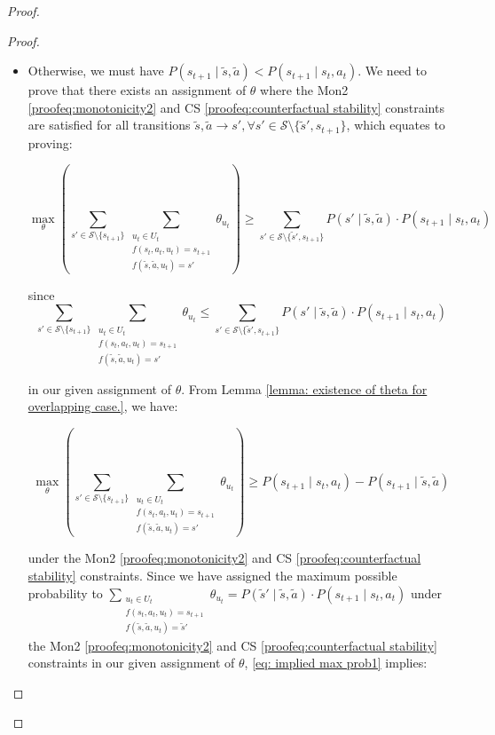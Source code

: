 \begin{proof}
\begin{proof}
\begin{itemize}
\begin{itemize}
        \item Otherwise, we must have $P(s_{t+1} \mid \tilde{s}, \tilde{a}) < P(s_{t+1} \mid s_t, a_t)$. We need to prove that there exists an assignment of $\theta$ where the Mon2 \eqref{proofeq:monotonicity2} and CS \eqref{proofeq:counterfactual stability} constraints are satisfied for all transitions $\tilde{s}, \tilde{a} \rightarrow s', \forall s' \in \mathcal{S}\setminus \{\tilde{s}', s_{t+1}\}$, which equates to proving:

        \[
        \max_{\theta}\left(\sum_{s' \in \mathcal{S}\setminus \{s_{t+1}\}}\sum_{\substack{u_t \in U_t\\f(s_t, a_t, u_t) = s_{t+1} \\ f(\tilde{s}, \tilde{a}, u_t) = s'}}{\theta_{u_t}}\right) \geq \sum_{s' \in \mathcal{S}\setminus\{\tilde{s}', s_{t+1}\}}P(s' \mid \tilde{s}, \tilde{a}) \cdot P(s_{t+1} \mid s_t, a_t)
        \]

        since 
        \[
        \sum_{s' \in \mathcal{S}\setminus \{s_{t+1}\}}\sum_{\substack{u_t \in U_t\\f(s_t, a_t, u_t) = s_{t+1} \\ f(\tilde{s}, \tilde{a}, u_t) = s'}}{\theta_{u_t}} \leq 
        \sum_{s' \in \mathcal{S}\setminus\{\tilde{s}', s_{t+1}\}}P(s' \mid \tilde{s}, \tilde{a}) \cdot P(s_{t+1} \mid s_t, a_t)
        \]
        
        in our given assignment of $\theta$. From Lemma \ref{lemma: existence of theta for overlapping case.}, we have:

        \begin{equation}
        \label{eq: implied max prob1}
            \max_{\theta}\left(\sum_{s' \in \mathcal{S}\setminus \{s_{t+1}\}}\sum_{\substack{u_t \in U_t\\f(s_t, a_t, u_t) = s_{t+1} \\ f(\tilde{s}, \tilde{a}, u_t) = s'}}{\theta_{u_t}}\right) \geq P(s_{t+1} \mid s_t, a_t) - P(s_{t+1} \mid \tilde{s}, \tilde{a})
        \end{equation}

        under the Mon2 \eqref{proofeq:monotonicity2} and CS \eqref{proofeq:counterfactual stability} constraints. Since we have assigned the maximum possible probability to $\sum_{\substack{u_t \in U_t \\f(s_t, a_t, u_t) = s_{t+1} \\ f(\tilde{s}, \tilde{a}, u_t) = \tilde{s}'}}{\theta_{u_t}} = P(\tilde{s}' \mid \tilde{s}, \tilde{a}) \cdot P(s_{t+1} \mid s_t, a_t)$ under the Mon2 \eqref{proofeq:monotonicity2} and CS \eqref{proofeq:counterfactual stability} constraints in our given assignment of $\theta$, \eqref{eq: implied max prob1} implies:


\end{itemize}
\end{itemize}
\end{proof}
\end{proof}
